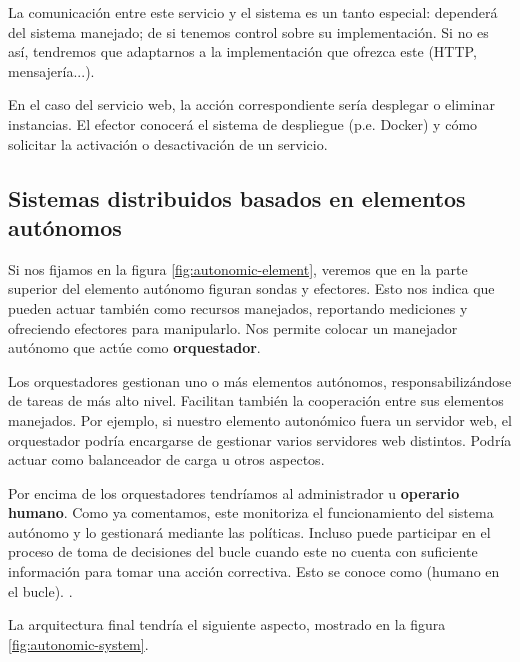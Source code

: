 La comunicación entre este servicio y el sistema es un tanto especial: dependerá del sistema manejado; de si tenemos control sobre su implementación. Si no es así, tendremos que adaptarnos a la implementación que ofrezca este (HTTP, mensajería...).

En el caso del servicio web, la acción correspondiente sería desplegar o eliminar instancias. El efector conocerá el sistema de despliegue (p.e. Docker) y cómo solicitar la activación o desactivación de un servicio.

\subsection{Sistemas distribuidos basados en elementos autónomos}

Si nos fijamos en la figura \ref{fig:autonomic-element}, veremos que en la parte superior del elemento autónomo figuran sondas y efectores. Esto nos indica que pueden actuar también como recursos manejados, reportando mediciones y ofreciendo efectores para manipularlo. Nos permite colocar un manejador autónomo que actúe como \textbf{orquestador}. \cite{ibmcorporationArchitecturalBlueprintAutonomic2006}

Los orquestadores gestionan uno o más elementos autónomos, responsabilizándose de tareas de más alto nivel. Facilitan también la cooperación entre sus elementos manejados. Por ejemplo, si nuestro elemento autonómico fuera un servidor web, el orquestador podría encargarse de gestionar varios servidores web distintos. Podría actuar como balanceador de carga u otros aspectos.

Por encima de los orquestadores tendríamos al administrador u \textbf{operario humano}. Como ya comentamos, este monitoriza el funcionamiento del sistema autónomo y lo gestionará mediante las políticas. Incluso puede participar en el proceso de toma de decisiones del bucle cuando este no cuenta con suficiente información para tomar una acción correctiva. Esto se conoce como \textbf{} (humano en el bucle). \cite{gilDesigningHumanLoop2016a}.

La arquitectura final tendría el siguiente aspecto, mostrado en la figura \ref{fig:autonomic-system}.

